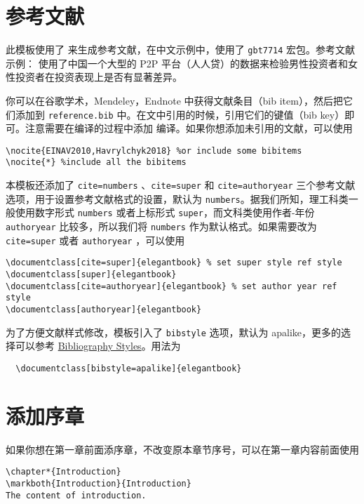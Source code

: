 \documentclass[cn,11pt]{elegantbook}
\begin{document}
\section{参考文献}

此模板使用了  来生成参考文献，在中文示例中，使用了 \lstinline{gbt7714} 宏包。参考文献示例：\cite{cn1,en2,en3} 使用了中国一个大型的 P2P 平台（人人贷）的数据来检验男性投资者和女性投资者在投资表现上是否有显著差异。

你可以在谷歌学术，Mendeley，Endnote 中获得文献条目（bib item），然后把它们添加到 \lstinline{reference.bib} 中。在文中引用的时候，引用它们的键值（bib key）即可。注意需要在编译的过程中添加  编译。如果你想添加未引用的文献，可以使用
\begin{lstlisting}[frame=single]
\nocite{EINAV2010,Havrylchyk2018} %or include some bibitems
\nocite{*} %include all the bibitems
\end{lstlisting}

本模板还添加了 \lstinline{cite=numbers} 、\lstinline{cite=super} 和 \lstinline{cite=authoryear}  三个参考文献选项，用于设置参考文献格式的设置，默认为 \lstinline{numbers}。据我们所知，理工科类一般使用数字形式 \lstinline{numbers} 或者上标形式 \lstinline{super}，而文科类使用作者-年份 \lstinline{authoryear} 比较多，所以我们将 \lstinline{numbers} 作为默认格式。如果需要改为 \lstinline{cite=super}  或者  \lstinline{authoryear} ，可以使用
\begin{lstlisting}
\documentclass[cite=super]{elegantbook} % set super style ref style
\documentclass[super]{elegantbook}
\documentclass[cite=authoryear]{elegantbook} % set author year ref style
\documentclass[authoryear]{elegantbook}
\end{lstlisting}

为了方便文献样式修改，模板引入了 \lstinline{bibstyle} 选项，默认为 apalike，更多的选择可以参考 \href{https://www.overleaf.com/learn/latex/Bibtex_bibliography_styles}{ Bibliography Styles}。用法为
\begin{lstlisting}
  \documentclass[bibstyle=apalike]{elegantbook} 
\end{lstlisting}

\section{添加序章}

如果你想在第一章前面添序章，不改变原本章节序号，可以在第一章内容前面使用 
\begin{lstlisting}
\chapter*{Introduction}
\markboth{Introduction}{Introduction}
The content of introduction.
\end{lstlisting}
\end{document}

